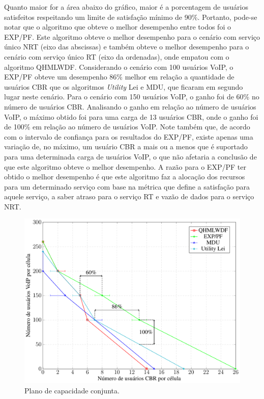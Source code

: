 Quanto maior for a área abaixo do gráfico, maior é a porcentagem de usuários satisfeitos respeitando um limite de satisfação mínimo de 90\%. Portanto, pode-se notar que o algoritmo que obteve o melhor desempenho entre todos foi o EXP/PF. Este algoritmo obteve o melhor desempenho para o cenário com serviço único NRT (eixo das abscissas) e também obteve o melhor desempenho para o cenário com serviço único RT (eixo da ordenadas), onde empatou com o algoritmo QHMLWDF. Considerando o cenário com 100 usuários VoIP, o EXP/PF obteve um desempenho 86\% melhor em relação a quantidade de usuários CBR que os algoritmos \textit{Utility} Lei e MDU, que ficaram em segundo lugar neste cenário. Para o cenário com 150 usuários VoIP, o ganho foi de 60\% no número de usuários CBR. Analisando o ganho em relação ao número de usuários VoIP, o máximo obtido foi para uma carga de 13 usuários CBR, onde o ganho foi de 100\% em relação ao número de usuários VoIP. Note também que, de acordo com o intervalo de confiança para os resultados do EXP/PF, existe apenas uma variação de, no máximo, um usuário CBR a mais ou a menos que é suportado para uma determinada carga de usuários VoIP, o que não afetaria a conclusão de que este algoritmo obteve o melhor desempenho.  A razão para o EXP/PF ter obtido o melhor desempenho é que este algoritmo faz a alocação dos recursos para um determinado serviço com base na métrica que define a satisfação para aquele serviço, a saber atraso para o serviço RT e vazão de dados para o serviço NRT. 

\begin{figure}[ht]
	\centering
	
	\caption[Plano de capacidade conjunta]{Plano de capacidade conjunta.}
	\includegraphics[width=1\linewidth]{figs/CapacityPlane.pdf}
	
	\label{fig:CapPlane}
\end{figure}

